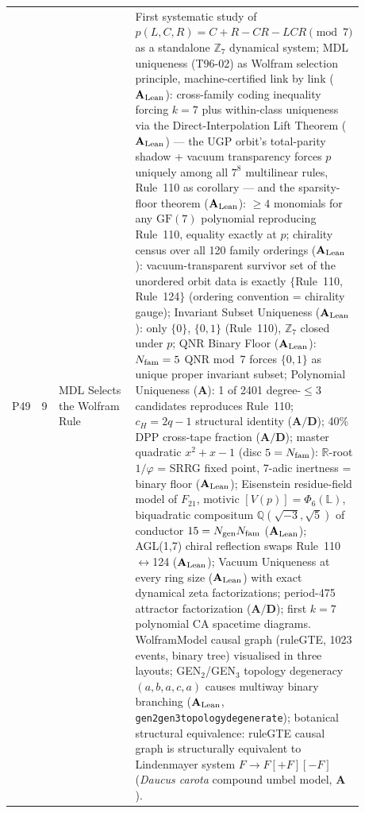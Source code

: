 \documentclass[11pt]{article}
\newcommand{\lean}[1]{%
  \penalty-100
  \begingroup\def\_{{\textunderscore\allowbreak}}\texttt{#1}\endgroup}
\newcommand{\CatAL}{\ensuremath{\textbf{A}_{\rm Lean}}}
\newcommand{\CatAD}{\textbf{A/D}}
\newcommand{\CatA}{\textbf{A}}
\begin{document}
\begin{longtable}{@{}P{0.05\linewidth}P{0.05\linewidth}P{0.33\linewidth}P{0.45\linewidth}@{}}
P49 & 9 & MDL Selects the Wolfram Rule & First systematic study of $p(L,C,R)=C+R-CR-LCR \pmod 7$ as a standalone $\mathbb{Z}_7$ dynamical system; MDL uniqueness (T96-02) as Wolfram selection principle, machine-certified link by link ($\CatAL$): cross-family coding inequality forcing $k=7$ plus within-class uniqueness via the Direct-Interpolation Lift Theorem ($\CatAL$) --- the UGP orbit's total-parity shadow + vacuum transparency forces $p$ uniquely among all $7^8$ multilinear rules, Rule~110 as corollary --- and the sparsity-floor theorem ($\CatAL$): $\geq 4$ monomials for any $\mathrm{GF}(7)$ polynomial reproducing Rule~110, equality exactly at $p$; chirality census over all 120 family orderings ($\CatAL$): vacuum-transparent survivor set of the unordered orbit data is exactly $\{$Rule~110, Rule~124$\}$ (ordering convention = chirality gauge); Invariant Subset Uniqueness ($\CatAL$): only $\{0\}$, $\{0,1\}$ (Rule~110), $\mathbb{Z}_7$ closed under $p$; QNR Binary Floor ($\CatAL$): $N_{\rm fam}=5$ QNR mod~7 forces $\{0,1\}$ as unique proper invariant subset; Polynomial Uniqueness ($\CatA$): 1 of 2401 degree-$\leq 3$ candidates reproduces Rule~110; $c_H=2q-1$ structural identity ($\CatAD$); 40\% DPP cross-tape fraction ($\CatAD$); master quadratic $x^2+x-1$ (disc $5=N_{\rm fam}$): $\mathbb{R}$-root $1/\varphi$ = SRRG fixed point, 7-adic inertness = binary floor ($\CatAL$); Eisenstein residue-field model of $F_{21}$, motivic $[V(p)]=\Phi_6(\mathbb{L})$, biquadratic compositum $\mathbb{Q}(\sqrt{-3},\sqrt{5})$ of conductor $15=N_{\rm gen}N_{\rm fam}$ ($\CatAL$); AGL(1,7) chiral reflection swaps Rule~110$\leftrightarrow$124 ($\CatAL$); Vacuum Uniqueness at every ring size ($\CatAL$) with exact dynamical zeta factorizations; period-475 attractor factorization ($\CatAD$); first $k=7$ polynomial CA spacetime diagrams. WolframModel causal graph (ruleGTE, 1023 events, binary tree) visualised in three layouts; GEN$_2$/GEN$_3$ topology degeneracy $(a,b,a,c,a)$ causes multiway binary branching ($\CatAL$, \lean{gen2\_gen3\_topology\_degenerate}); botanical structural equivalence: ruleGTE causal graph is structurally equivalent to Lindenmayer system $F\!\to\!F[{+}F][{-}F]$ (\emph{Daucus carota} compound umbel model, $\CatA$). \\

\end{longtable}
\end{document}
